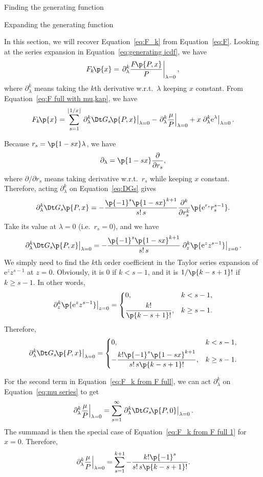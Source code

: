 \documentclass[oneside,12pt,final]{ucthesis-CA2012}
\newcommand{\mrm}[1]{\mathrm{#1}}
\newcommand{\lmd}{\lambda}
\newcommand{\e}{\mrm{e}}
\newcommand{\fr}{\frac}
\newcommand{\fc}[2]{#1\mathchoice{\!}{\!}{}{}\p{#2}} %
\newcommand{\tp}[3][]{
	\ifthenelse{\equal{#1}{}}
	{\fr{\partial#2}{\partial#3}}{\p{\fr{\partial#2}{\partial#3}}_{#1}}
} %
\newcommand{\abar}[2]{\left.#1\right|_{#2}} %
\newcommand\floor[1]{\left\lfloor#1\right\rfloor}
\begin{document}
\begin{mainmatter}
\begin{section}{Finding the generating function}
\end{section}
\begin{section}{Expanding the generating function}
\label{sec:fun to seq}

In this section, we will recover Equation~\ref{eq:F_k} from Equation~\ref{eq:F}.
Looking at the series expansion in Equation~\ref{eq:generating icdf}, we have
\[\fc{F_k}x=\abar{\partial_\lmd^k\fr{\fc F{P,x}}P}{\lmd=0},\]
where $\partial_\lmd^k$ means taking the $k$th derivative w.r.t.\ $\lmd$ keeping $x$ constant.
From Equation~\ref{eq:F full with mu,kap}, we have
\begin{equation}
	\label{eq:F_k from F full}
	\fc{F_k}x=\sum_{s=1}^{\floor{1/x}}\abar{\partial_\lmd^k\fc{\Dt G_s}{P,x}}{\lmd=0}
	-\abar{\partial_\lmd^k\fr\mu P}{\lmd=0}+x\abar{\partial_\lmd^k\e^\lmd}{\lmd=0}.
\end{equation}

Because $r_s=\p{1-sx}\lmd$, we have
\[\partial_\lmd=\p{1-sx}\tp{}{r_s},\]
where $\partial/\partial r_s$ means taking derivative w.r.t.\ $r_s$ while keeping $x$ constant.
Therefore, acting $\partial_\lmd^k$ on Equation~\ref{eq:DGs} gives
\[\partial_\lmd^k\fc{\Dt G_s}{P,x}
=-\fr{\p{-1}^s\p{1-sx}^{k+1}}{s!\,s}\fr{\partial^k}{\partial r_s^k}\p{\e^{r_s}r_s^{s-1}}.\]
Take its value at $\lmd=0$ (i.e.\ $r_s=0$), and we have
\[\abar{\partial_\lmd^k\fc{\Dt G_s}{P,x}}{\lmd=0}
=-\fr{\p{-1}^s\p{1-sx}^{k+1}}{s!\,s}\abar{\partial_z^k\p{\e^zz^{s-1}}}{z=0}.\]
We simply need to find the $k$th order coefficient
in the Taylor series expansion of $\e^zz^{s-1}$ at $z=0$.
Obviously, it is $0$ if $k<s-1$, and it is $1/\p{k-s+1}!$ if $k\ge s-1$.
In other words,
\[\abar{\partial_z^k\p{\e^zz^{s-1}}}{z=0}=\begin{dcases}
	0,&k<s-1,\\
	\fr{k!}{\p{k-s+1}!},&k\ge s-1.
\end{dcases}\]
Therefore,
\begin{equation}
	\label{eq:F_k from F full 1}
	\abar{\partial_\lmd^k\fc{\Dt G_s}{P,x}}{\lmd=0}
	=\begin{dcases}
		0,&k<s-1,\\
		-\fr{k!\p{-1}^s\p{1-sx}^{k+1}}{s!\,s\p{k-s+1}!},&k\ge s-1.
	\end{dcases}
\end{equation}

For the second term in Equation~\ref{eq:F_k from F full},
we can act $\partial_\lmd^k$ on Equation~\ref{eq:mu series} to get
\[\abar{\partial_\lmd^k\fr\mu P}{\lmd=0}
=\sum_{s=1}^\infty\abar{\partial_\lmd^k\fc{\Dt G_s}{P,0}}{\lmd=0}.\]
The summand is then the special case of Equation~\ref{eq:F_k from F full 1} for $x=0$.
Therefore,
\begin{equation}
	\label{eq:F_k from F full 2}
	\abar{\partial_\lmd^k\fr\mu P}{\lmd=0}
	=\sum_{s=1}^{k+1}-\fr{k!\p{-1}^s}{s!\,s\p{k-s+1}!}.
\end{equation}


\end{section}
\end{mainmatter}
\end{document}

